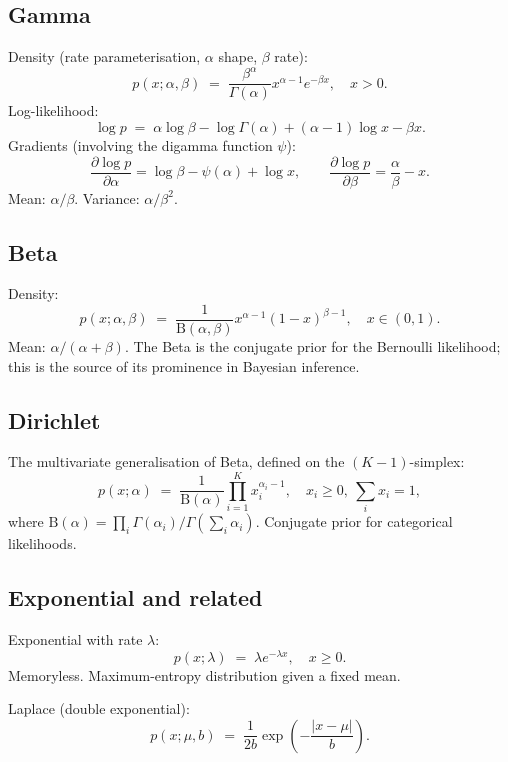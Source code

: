 \subsection{Gamma}
\label{ssec:distributions:gamma_detail}

Density (rate parameterisation, $\alpha$ shape, $\beta$ rate):
\[
p(x; \alpha, \beta) \;=\; \frac{\beta^\alpha}{\Gamma(\alpha)}
x^{\alpha - 1} e^{-\beta x},
\quad x > 0.
\]
Log-likelihood:
\[
\log p \;=\; \alpha \log \beta - \log\Gamma(\alpha) + (\alpha - 1)\log x - \beta x.
\]
Gradients (involving the digamma function $\psi$):
\[
\frac{\partial \log p}{\partial \alpha} = \log \beta - \psi(\alpha) + \log x,
\qquad
\frac{\partial \log p}{\partial \beta} = \frac{\alpha}{\beta} - x.
\]
Mean: $\alpha/\beta$. Variance: $\alpha/\beta^2$.

\subsection{Beta}
\label{ssec:distributions:beta_detail}

Density:
\[
p(x; \alpha, \beta) \;=\; \frac{1}{\mathrm{B}(\alpha, \beta)}
x^{\alpha - 1} (1 - x)^{\beta - 1},
\quad x \in (0, 1).
\]
Mean: $\alpha / (\alpha + \beta)$. The Beta is the conjugate
prior for the Bernoulli likelihood; this is the source of its
prominence in Bayesian inference.

\subsection{Dirichlet}
\label{ssec:distributions:dirichlet_detail}

The multivariate generalisation of Beta, defined on the
$(K-1)$-simplex:
\[
p(x; \alpha) \;=\; \frac{1}{\mathrm{B}(\alpha)}
\prod_{i=1}^K x_i^{\alpha_i - 1},
\quad x_i \geq 0,\ \sum_i x_i = 1,
\]
where $\mathrm{B}(\alpha) = \prod_i \Gamma(\alpha_i) /
\Gamma(\sum_i \alpha_i)$. Conjugate prior for categorical
likelihoods.

\subsection{Exponential and related}
\label{ssec:distributions:exp_related}

Exponential with rate $\lambda$:
\[
p(x; \lambda) \;=\; \lambda e^{-\lambda x},
\quad x \geq 0.
\]
Memoryless. Maximum-entropy distribution given a fixed mean.

Laplace (double exponential):
\[
p(x; \mu, b) \;=\; \frac{1}{2b} \exp\!\left(-\frac{|x - \mu|}{b}\right).
\]

